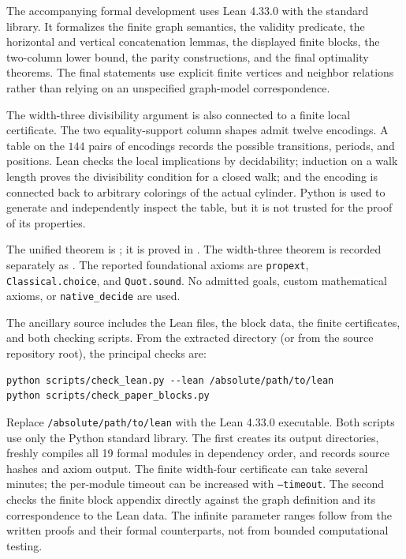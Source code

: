 \documentclass[11pt]{article}
\theoremstyle{definition}
\theoremstyle{remark}
\begin{document}
The accompanying formal development uses Lean 4.33.0 with the standard library. It formalizes the finite graph semantics, the validity predicate, the horizontal and vertical concatenation lemmas, the displayed finite blocks, the two-column lower bound, the parity constructions, and the final optimality theorems. The final statements use explicit finite vertices and neighbor relations rather than relying on an unspecified graph-model correspondence.

The width-three divisibility argument is also connected to a finite local certificate. The two equality-support column shapes admit twelve encodings. A table on the $144$ pairs of encodings records the possible transitions, periods, and positions. Lean checks the local implications by decidability; induction on a walk length proves the divisibility condition for a closed walk; and the encoding is connected back to arbitrary colorings of the actual cylinder. Python is used to generate and independently inspect the table, but it is not trusted for the proof of its properties.

The unified theorem is ; it is proved in . The width-three theorem is recorded separately as . The reported foundational axioms are \texttt{propext}, \texttt{Classical.choice}, and \texttt{Quot.sound}. No admitted goals, custom mathematical axioms, or \texttt{native\_decide} are used.

The ancillary source includes the Lean files, the block data, the finite certificates, and both checking scripts. From the extracted  directory (or from the source repository root), the principal checks are:
{\small
\begin{verbatim}
python scripts/check_lean.py --lean /absolute/path/to/lean
python scripts/check_paper_blocks.py
\end{verbatim}}
Replace \texttt{/absolute/path/to/lean} with the Lean 4.33.0 executable. Both scripts use only the Python standard library. The first creates its output directories, freshly compiles all 19 formal modules in dependency order, and records source hashes and axiom output. The finite width-four certificate can take several minutes; the per-module timeout can be increased with \texttt{--timeout}. The second checks the finite block appendix directly against the graph definition and its correspondence to the Lean data. The infinite parameter ranges follow from the written proofs and their formal counterparts, not from bounded computational testing.
\end{document}
